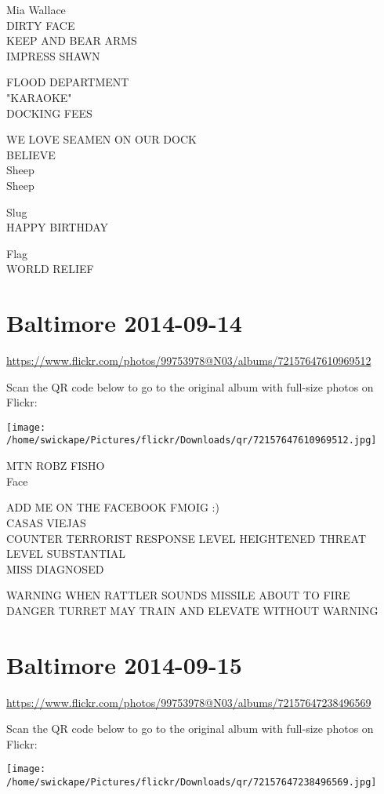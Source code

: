 \documentclass[10pt,letterpaper]{article}
\begin{document}
Mia Wallace\\
DIRTY FACE\\
KEEP AND BEAR ARMS\\
IMPRESS SHAWN

FLOOD DEPARTMENT\\
"KARAOKE"\\
DOCKING FEES

WE LOVE SEAMEN ON OUR DOCK\\
BELIEVE\\
Sheep\\
Sheep

Slug\\
HAPPY BIRTHDAY

Flag\\
WORLD RELIEF


\section*{Baltimore 2014-09-14}

\url{https://www.flickr.com/photos/99753978@N03/albums/72157647610969512}

Scan the QR code below to go to the original album with full-size photos on Flickr:

\texttt{[image: /home/swickape/Pictures/flickr/Downloads/qr/72157647610969512.jpg]}


MTN ROBZ FISHO\\
Face

ADD ME ON THE FACEBOOK FMOIG :)\\
CASAS VIEJAS\\
COUNTER TERRORIST RESPONSE LEVEL HEIGHTENED THREAT LEVEL SUBSTANTIAL\\
MISS DIAGNOSED

WARNING WHEN RATTLER SOUNDS MISSILE ABOUT TO FIRE\\
DANGER TURRET MAY TRAIN AND ELEVATE WITHOUT WARNING


\section*{Baltimore 2014-09-15}

\url{https://www.flickr.com/photos/99753978@N03/albums/72157647238496569}

Scan the QR code below to go to the original album with full-size photos on Flickr:

\texttt{[image: /home/swickape/Pictures/flickr/Downloads/qr/72157647238496569.jpg]}
\end{document}
